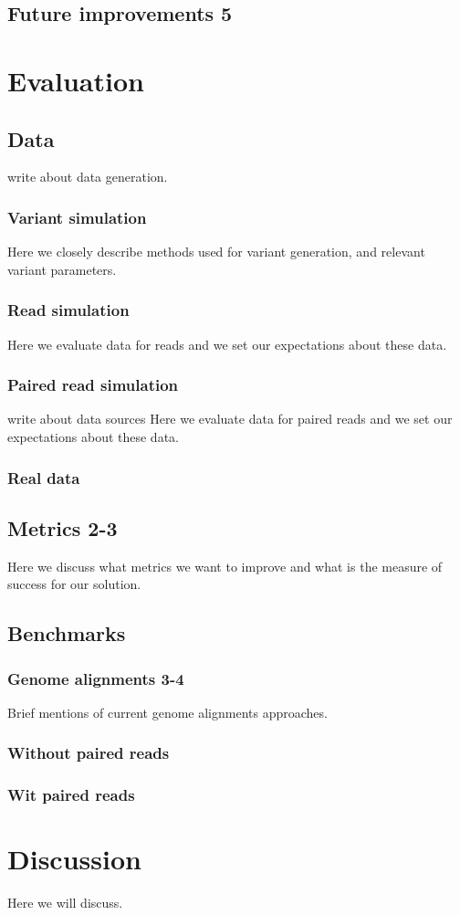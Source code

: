 	\section{Future improvements 5}

\chapter{Evaluation}

\section{Data}
write about data generation.
\subsection{Variant simulation}
Here we closely describe methods used for variant generation, and relevant variant parameters.
\subsection{Read simulation}
Here we evaluate data for reads and we set our expectations about these data.
\subsection{Paired read simulation}
write about data sources
Here we evaluate data for paired reads and we set our expectations about these data.
\subsection{Real data}
\section{Metrics 2-3}
Here we discuss what metrics we want to improve and what is the measure of success for our solution.
\section{Benchmarks}
\subsection{Genome alignments 3-4}
Brief mentions of current genome alignments approaches.
\subsection{Without paired reads}
\subsection{Wit paired reads}


\chapter{Discussion}
Here we will discuss.



